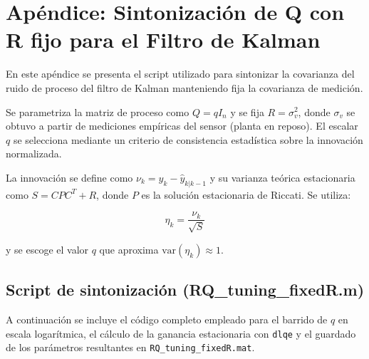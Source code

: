 \section{Apéndice: Sintonización de Q con R fijo para el Filtro de Kalman}
\label{ap:kalman_tuning}

En este apéndice se presenta el script utilizado para sintonizar la
covarianza del ruido de proceso del filtro de Kalman manteniendo fija la
covarianza de medición.

Se parametriza la matriz de proceso como \(Q = q I_n\) y se fija
\(R = \sigma_v^2\), donde \(\sigma_v\) se obtuvo a partir de mediciones
empíricas del sensor (planta en reposo). El escalar \(q\) se selecciona
mediante un criterio de consistencia estadística sobre la innovación
normalizada.

La innovación se define como \(\nu_k = y_k - \hat{y}_{k|k-1}\) y su varianza
teórica estacionaria como \(S = C P C^T + R\), donde \(P\) es la solución
estacionaria de Riccati. Se utiliza:

\[
\eta_k = \frac{\nu_k}{\sqrt{S}}
\]

y se escoge el valor \(q\) que aproxima \(\mathrm{var}(\eta_k)\approx 1\).

\subsection{Script de sintonización (RQ\_tuning\_fixedR.m)}
A continuación se incluye el código completo empleado para el barrido de \(q\)
en escala logarítmica, el cálculo de la ganancia estacionaria con \texttt{dlqe}
y el guardado de los parámetros resultantes en \texttt{RQ\_tuning\_fixedR.mat}.

